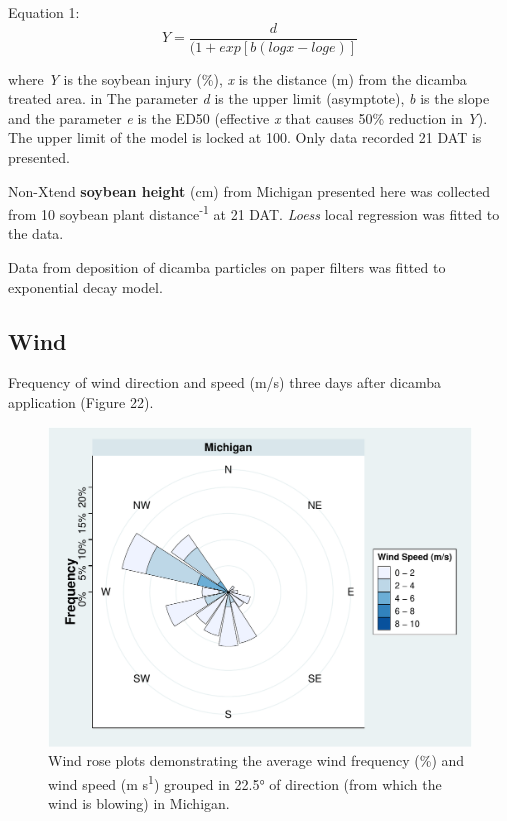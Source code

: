 \documentclass[]{article}
\begin{document}
Equation 1: \[Y= \frac{d}{(1 + exp[b(logx - loge)]} \]

where \emph{Y} is the soybean injury (\%), \emph{x} is the distance (m)
from the dicamba treated area. in The parameter \emph{d} is the upper
limit (asymptote), \emph{b} is the slope and the parameter \emph{e} is
the ED50 (effective \emph{x} that causes 50\% reduction in \emph{Y}).
The upper limit of the model is locked at 100. Only data recorded 21 DAT
is presented.

Non-Xtend \textbf{soybean height} (cm) from Michigan presented here was
collected from 10 soybean plant distance\textsuperscript{-1} at 21 DAT.
\emph{Loess} local regression was fitted to the data.

Data from deposition of dicamba particles on paper filters was fitted to
exponential decay model.

\pagebreak
\newpage

\subsection{Wind}\label{wind-2}

Frequency of wind direction and speed (m/s) three days after dicamba
application (Figure 22).

\begin{figure}
\centering
\includegraphics{Report_files/figure-latex/unnamed-chunk-47-1.pdf}
\caption{Wind rose plots demonstrating the average wind frequency (\%)
and wind speed (m s\textsuperscript{1}) grouped in 22.5° of direction
(from which the wind is blowing) in Michigan.}
\end{figure}
\end{document}
